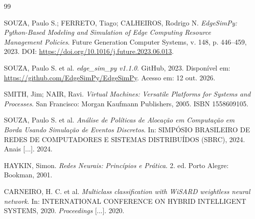 \documentclass[12pt,a4paper]{article}
\begin{document}
\begin{thebibliography}{99}

SOUZA, Paulo S.; FERRETO, Tiago; CALHEIROS, Rodrigo N.
\textit{EdgeSimPy: Python-Based Modeling and Simulation of Edge Computing Resource Management Policies}.
Future Generation Computer Systems, v. 148, p. 446--459, 2023.
DOI: \url{https://doi.org/10.1016/j.future.2023.06.013}.

SOUZA, Paulo S. et al.
\textit{edge\_sim\_py v1.1.0}.
GitHub, 2023.
Disponível em: \url{https://github.com/EdgeSimPy/EdgeSimPy}.
Acesso em: 12 out. 2026.

SMITH, Jim; NAIR, Ravi.
\textit{Virtual Machines: Versatile Platforms for Systems and Processes}.
San Francisco: Morgan Kaufmann Publishers, 2005.
ISBN 1558609105.

SOUZA, Paulo S. et al.
\textit{Análise de Políticas de Alocação em Computação em Borda Usando Simulação de Eventos Discretos}.
In: SIMPÓSIO BRASILEIRO DE REDES DE COMPUTADORES E SISTEMAS DISTRIBUÍDOS (SBRC), 2024.
Anais [...]. 2024.

HAYKIN, Simon.
\textit{Redes Neurais: Princípios e Prática}.
2. ed. Porto Alegre: Bookman, 2001.

CARNEIRO, H. C. et al.
\textit{Multiclass classification with WiSARD weightless neural network}.
In: INTERNATIONAL CONFERENCE ON HYBRID INTELLIGENT SYSTEMS, 2020.
\textit{Proceedings} [...]. 2020.

\end{thebibliography}
\end{document}
